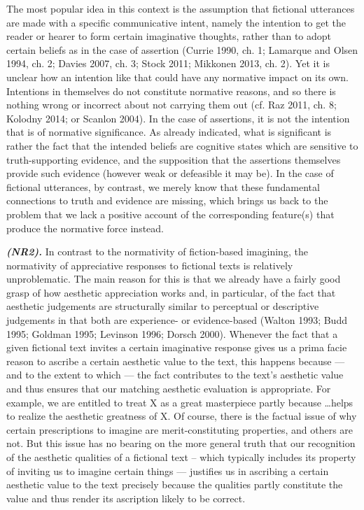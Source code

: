 The most popular idea in this context is the assumption that fictional utterances are made with a specific communicative intent, namely the intention to get the reader or hearer to form certain imaginative thoughts, rather than to adopt certain beliefs as in the case of assertion (Currie 1990, ch. 1; Lamarque and Olsen 1994, ch. 2; Davies 2007, ch. 3; Stock 2011; Mikkonen 2013, ch. 2). Yet it is unclear how an intention like that could have any normative impact on its own. Intentions in themselves do not constitute normative reasons, and so there is nothing wrong or incorrect about not carrying them out (cf. Raz 2011, ch. 8; Kolodny 2014; or Scanlon 2004). In the case of assertions, it is not the intention that is of normative significance. As already indicated, what is significant is rather the fact that the intended beliefs are cognitive states which are sensitive to truth-supporting evidence, and the supposition that the assertions themselves provide such evidence (however weak or defeasible it may be). In the case of fictional utterances, by contrast, we merely know that these fundamental connections to truth and evidence are missing, which brings us back to the problem that we lack a positive account of the corresponding feature(s) that produce the normative force instead.

\vspace{.2cm}
\noindent\textbf{\emph{(NR2).}} In contrast to the normativity of fiction-based imagining, the normativity of appreciative responses to fictional texts is relatively unproblematic. The main reason for this is that we already have a fairly good grasp of how aesthetic appreciation works and, in particular, of the fact that aesthetic judgements are structurally similar to perceptual or descriptive judgements in that both are experience- or evidence-based (Walton 1993; Budd 1995; Goldman 1995; Levinson 1996; Dorsch 2000). Whenever the fact that a given fictional text invites a certain imaginative response gives us a prima facie reason to ascribe a certain aesthetic value to the text, this happens because --- and to the extent to which --- the fact contributes to the text's aesthetic value and thus ensures that our matching aesthetic evaluation is appropriate. For example, we are entitled to treat X as a great masterpiece partly because \ldots helps to realize the aesthetic greatness of X. Of course, there is the factual issue of why certain prescriptions to imagine are merit-constituting properties, and others are not. But this issue has no bearing on the more general truth that our recognition of the aesthetic qualities of a fictional text -- which typically includes its property of inviting us to imagine certain things --- justifies us in ascribing a certain aesthetic value to the text precisely because the qualities partly constitute the value and thus render its ascription likely to be correct.

